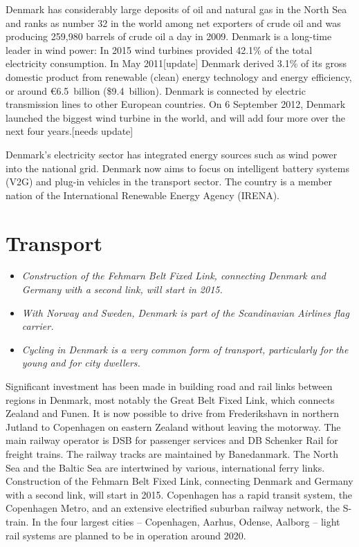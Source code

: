 Denmark has considerably large deposits of oil and natural gas in the
North Sea and ranks as number 32 in the world among net exporters of
crude oil and was producing 259,980 barrels of crude oil a day in 2009.
Denmark is a long-time leader in wind power: In 2015 wind turbines
provided 42.1\% of the total electricity consumption. In May
2011{[}update{]} Denmark derived 3.1\% of its gross domestic product
from renewable (clean) energy technology and energy efficiency, or
around \euro{}6.5~billion (\$9.4~billion). Denmark is connected by
electric transmission lines to other European countries. On 6 September
2012, Denmark launched the biggest wind turbine in the world, and will
add four more over the next four years.{[}needs update{]}

Denmark's electricity sector has integrated energy sources such as wind
power into the national grid. Denmark now aims to focus on intelligent
battery systems (V2G) and plug-in vehicles in the transport sector. The
country is a member nation of the International Renewable Energy Agency
(IRENA).

\section{Transport}\label{transport}

\begin{itemize}
\item
  \emph{Construction of the Fehmarn Belt Fixed Link, connecting Denmark
  and Germany with a second link, will start in 2015.}
\item
  \emph{With Norway and Sweden, Denmark is part of the Scandinavian
  Airlines flag carrier.}
\item
  \emph{Cycling in Denmark is a very common form of transport,
  particularly for the young and for city dwellers.}
\end{itemize}

Significant investment has been made in building road and rail links
between regions in Denmark, most notably the Great Belt Fixed Link,
which connects Zealand and Funen. It is now possible to drive from
Frederikshavn in northern Jutland to Copenhagen on eastern Zealand
without leaving the motorway. The main railway operator is DSB for
passenger services and DB Schenker Rail for freight trains. The railway
tracks are maintained by Banedanmark. The North Sea and the Baltic Sea
are intertwined by various, international ferry links. Construction of
the Fehmarn Belt Fixed Link, connecting Denmark and Germany with a
second link, will start in 2015. Copenhagen has a rapid transit system,
the Copenhagen Metro, and an extensive electrified suburban railway
network, the S-train. In the four largest cities -- Copenhagen, Aarhus,
Odense, Aalborg -- light rail systems are planned to be in operation
around 2020.

